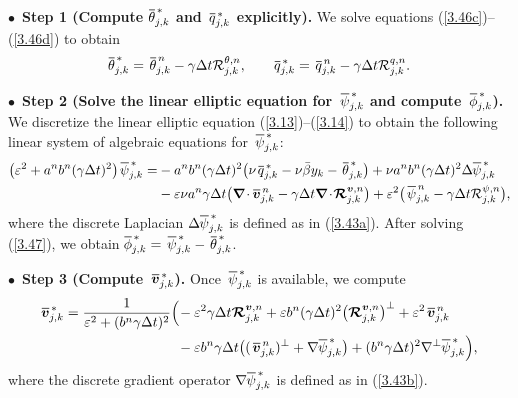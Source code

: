 \documentclass[a4paper,11pt,twoside]{article}
\numberwithin{equation}{section}
\numberwithin{figure}{section}
\numberwithin{table}{section}
\newcommand{\bnabla}{\bm{\nabla}}
\newcommand{\eps}{\varepsilon}
\newcommand{\dt}{\Delta t}
\newcommand{\bv}{\bm{v}}
\newcommand\eref[1]{(\ref{#1})}
\newcommand*\xbar[1]{%
	\hbox{%
		\vbox{%
			\hrule height 0.5pt %
			\kern0.3ex%
			\hbox{%
				\kern-0.05em%
				\ensuremath{#1}%
				\kern-0.02em%
			}%
		}%
	}%
}
\begin{document}
\smallskip
\noindent
$\bullet\,$ \textbf{Step 1 (Compute $\xbar\theta^{\,*}_{j,k}$ and $\,\xbar q^{\,*}_{j,k}$ explicitly).} We solve equations
\eref{3.46c}--\eref{3.46d} to obtain
\begin{equation*}
\xbar\theta^{\,*}_{j,k}=\,\xbar\theta^{\,n}_{j,k}-\gamma\dt{\cal R}^{\theta,n}_{j,k},\qquad
\xbar q^{\,*}_{j,k}=\,\xbar q^{\,n}_{j,k}-\gamma\dt{\cal R}^{q,n}_{j,k}.
\end{equation*}

\smallskip
\noindent
$\bullet\,$ \textbf{Step 2 (Solve the linear elliptic equation for $\,\xbar{\psi}^{\,*}_{j,k}$ and compute $\,\xbar{\phi}^{\,*}_{j,k}$).} We
discretize the linear elliptic equation \eref{3.13}--\eref{3.14} to obtain the following linear system of algebraic equations for
$\,\xbar{\psi}^{\,*}_{j,k}$:
\begin{equation}
\begin{aligned}
\big(\eps^2+a^nb^n(\gamma\dt)^2\big)\,\xbar{\psi}^{\,*}_{j,k}=&-a^nb^n(\gamma\dt)^2\big(\nu\,\xbar q^{\,*}_{j,k}-\nu\bar{\beta}y_k-
\,\xbar\theta^{\,*}_{j,k}\big)+\nu a^nb^n(\gamma\dt)^2\Delta\xbar{\psi}^{\,*}_{j,k}\\
&-\eps\nu a^n\gamma\dt\big(\bnabla\!\cdot\xbar{\bv}^{\,n}_{j,k}-\gamma\dt\bnabla\!\cdot\!\bm{{\cal R}}^{\bv,n}_{j,k}\big)
+\eps^2\big(\,\xbar\psi^{\,n}_{j,k}-\gamma\dt{\cal R}^{\psi,n}_{j,k}\big),
\end{aligned}
\label{3.47}
\end{equation}
where the discrete Laplacian $\Delta\xbar{\psi}^{\,*}_{j,k}$ is defined as in \eref{3.43a}. After solving \eref{3.47}, we obtain
$\xbar{\phi}^{\,*}_{j,k}=\,\xbar\psi^{\,*}_{j,k}-\,\xbar\theta^{\,*}_{j,k}$.

\smallskip
\noindent
$\bullet\,$ \textbf{Step 3 (Compute $\,\xbar{\bv}^{\,*}_{j,k}$).} Once $\,\xbar\psi^{\,*}_{j,k}$ is available, we compute	
\begin{equation*}
\begin{aligned}
\xbar{\bv}^{\,*}_{j,k}=\frac{1}{\eps^2+(b^n\gamma\dt)^2}\Big(\!&-\eps^2\gamma\dt\bm{{\cal R}}^{\bv,n}_{j,k}
+\eps b^n(\gamma\dt)^2\big(\bm{{\cal R}}^{\bv,n}_{j,k}\big)^\perp+\eps^2\,\xbar{\bv}^{\,n}_{j,k}\\
&-\eps b^n\gamma\dt\big((\,\xbar{\bv}^{\,n}_{j,k})^\perp+\nabla\xbar\psi^{\,*}_{j,k}\big)+
(b^n\gamma\dt)^2\nabla^\perp\xbar\psi^{\,*}_{j,k}\Big),
\end{aligned}
\end{equation*}
where the discrete gradient operator $\nabla\xbar{\psi}^{\,*}_{j,k}$ is defined as in \eref{3.43b}.
	
\end{document}
